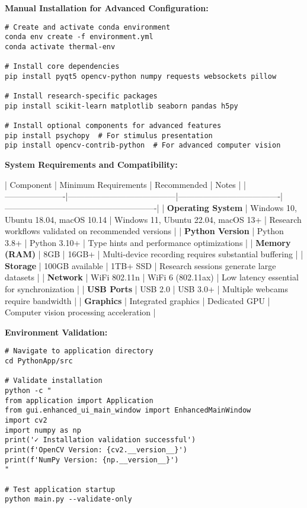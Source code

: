\documentclass[12pt,a4paper]{article}
\begin{document}
\textbf{Manual Installation for Advanced Configuration:}

\begin{verbatim}
# Create and activate conda environment
conda env create -f environment.yml
conda activate thermal-env

# Install core dependencies
pip install pyqt5 opencv-python numpy requests websockets pillow

# Install research-specific packages
pip install scikit-learn matplotlib seaborn pandas h5py

# Install optional components for advanced features
pip install psychopy  # For stimulus presentation
pip install opencv-contrib-python  # For advanced computer vision
\end{verbatim}

\textbf{System Requirements and Compatibility:}

| Component            | Minimum Requirements                  | Recommended                         | Notes                                                 |
|----------------------|---------------------------------------|-------------------------------------|-------------------------------------------------------|
| \textbf{Operating System} | Windows 10, Ubuntu 18.04, macOS 10.14 | Windows 11, Ubuntu 22.04, macOS 13+ | Research workflows validated on recommended versions  |
| \textbf{Python Version}   | Python 3.8+                           | Python 3.10+                        | Type hints and performance optimizations              |
| \textbf{Memory (RAM)}     | 8GB                                   | 16GB+                               | Multi-device recording requires substantial buffering |
| \textbf{Storage}          | 100GB available                       | 1TB+ SSD                            | Research sessions generate large datasets             |
| \textbf{Network}          | WiFi 802.11n                          | WiFi 6 (802.11ax)                   | Low latency essential for synchronization             |
| \textbf{USB Ports}        | USB 2.0                               | USB 3.0+                            | Multiple webcams require bandwidth                    |
| \textbf{Graphics}         | Integrated graphics                   | Dedicated GPU                       | Computer vision processing acceleration               |

\textbf{Environment Validation:}

\begin{verbatim}
# Navigate to application directory
cd PythonApp/src

# Validate installation
python -c "
from application import Application
from gui.enhanced_ui_main_window import EnhancedMainWindow
import cv2
import numpy as np
print('✓ Installation validation successful')
print(f'OpenCV Version: {cv2.__version__}')
print(f'NumPy Version: {np.__version__}')
"

# Test application startup
python main.py --validate-only
\end{verbatim}
\end{document}
